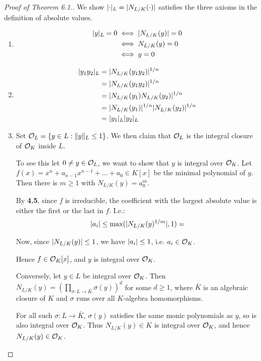 \documentclass[10pt,a4paper]{article}
\begin{document}
\begin{proof}[Proof of Theorem 6.1.]
  We show $\lvert\cdot\rvert_L= \lvert N_{L/K}(\cdot)\rvert$ satisfies the three axioms in the definition of absolute values.
  \begin{enumerate}
    \item
    \begin{align*}
      \lvert y\rvert_L = 0 &\iff \lvert N_{L/K}(y)\rvert = 0\\
      &\iff N_{L/K}(y) = 0\\
      &\iff y=0
    \end{align*}
    \item
    \begin{align*}
      \lvert y_1y_2\rvert_L &= \lvert N_{L/K}(y_1y_2)\rvert^{1/n}\\
      &= \lvert N_{L/K}(y_1 y_2)\rvert^{1/n}\\
      &= \lvert N_{L/K}(y_1)N_{L/K}(y_2)\rvert^{1/n}\\
      &= \lvert N_{L/K}(y_1)\rvert^{1/n}\lvert N_{L/K}(y_2)\rvert^{1/n}\\
      &= \lvert y_1\rvert_L \lvert y_2\rvert_L
    \end{align*}
    \item Set $\mathcal{O}_L = \{y \in L : \lVert y\rVert_L \leq 1\}$.
    We then claim that $\mathcal{O}_L$ is the integral closure of $\mathcal{O}_K$ inside $L$.

    To see this let $0 \neq y \in \mathcal{O}_L$, we want to show that $y$ is integral over $\mathcal{O}_K$. Let $f(x) = x^n+a_{n-1} x^{n-1} + \ldots + a_0 \in K[x]$ be the minimal polynomial of $y$. Then there is $m \geq 1$ with $N_{L/K}(y) = a_0^m$.

    By \textbf{4.5}, since $f$ is irreducible, the coefficient with the largest absolute value is either the first or the last in $f$. I.e.:
    \[ \lvert a_i\rvert \leq \max(\lvert N_{L/K}(y)^{1/m}\rvert, 1) = \]

    Now, since $\lvert N_{L/K}(y)\rvert \leq 1$, we have $\lvert a_i\rvert \leq 1$, i.e. $a_i \in \mathcal{O}_K$.

    Hence $f \in \mathcal{O}_K[x]$, and $y$ is integral over $\mathcal{O}_K$.

    Conversely, let $y \in L$ be integral over $\mathcal{O}_K$. Then $N_{L/K}(y) = \left(\prod_{\sigma:L\to \bar{K}} \sigma(y)\right)^d$ for some $d \geq 1$, where $\bar{K}$ is an algebraic closure of $K$ and $\sigma$ runs over all $K$-algebra homomorphisms.

    For all such $\sigma:L \to \bar{K}$, $\sigma(y)$ satisfies the same monic polynomials as $y$, so is also integral over $\mathcal{O}_K$. Thus $N_{L/K}(y) \in K$ is integral over $\mathcal{O}_K$, and hence $N_{L/K}(y) \in \mathcal{O}_K$.


\end{enumerate}
\end{proof}
\end{document}
